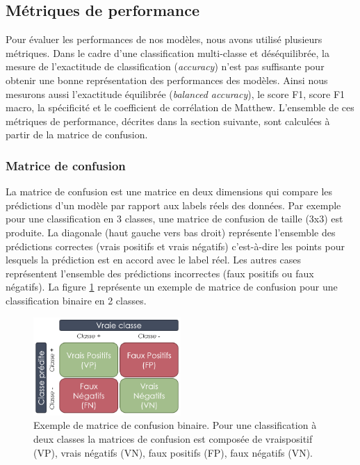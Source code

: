 \subsection{Métriques de performance}
Pour évaluer les performances de nos modèles, nous avons utilisé plusieurs métriques. Dans le cadre d'une classification multi-classe et déséquilibrée, la mesure de l'exactitude de classification (\textit{accuracy}) n'est pas suffisante pour obtenir une bonne représentation des performances des modèles. Ainsi nous mesurons aussi l'exactitude équilibrée (\textit{balanced accuracy}), le score F1, score F1 macro, la spécificité et le coefficient de corrélation de Matthew. L'ensemble de ces métriques de performance, décrites dans la section suivante, sont calculées à partir de la matrice de confusion.

\subsubsection{Matrice de confusion}
La matrice de confusion est une matrice en deux dimensions qui compare les prédictions d'un modèle par rapport aux labels réels des données. Par exemple pour une classification en 3 classes, une matrice de confusion de taille (3x3) est produite. La diagonale (haut gauche vers bas droit) représente l'ensemble des prédictions correctes (vrais positifs et vrais négatifs) c'est-à-dire les points pour lesquels la prédiction est en accord avec le label réel. Les autres cases représentent l'ensemble des prédictions incorrectes (faux positifs ou faux négatifs). La figure \ref{fig:confusion-example} représente un exemple de matrice de confusion pour une classification binaire en 2 classes.
\begin{figure}[!ht]
 \centering
 \includegraphics[width=0.5\textwidth]{figures/confusion_example.png}
 \caption[Exemple de matrice de confusion binaire]{Exemple de matrice de confusion binaire. Pour une classification à deux classes la matrices de confusion est composée de vraispositif (VP), vrais négatifs (VN), faux positifs (FP), faux négatifs (VN).}
 \label{fig:confusion-example}
\end{figure}


